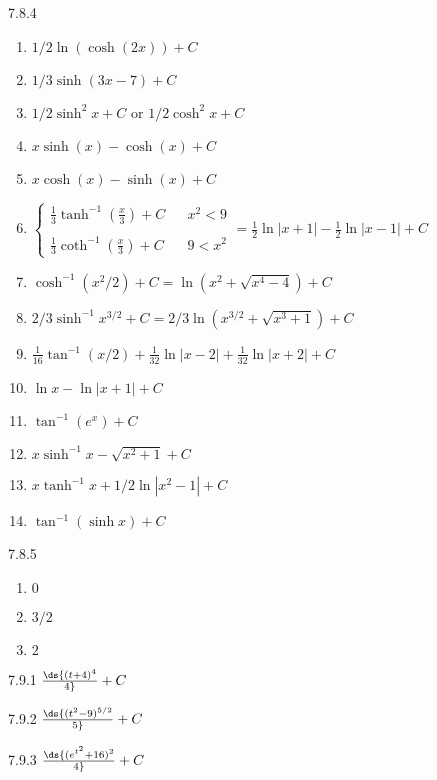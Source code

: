 \begin{Answer}{7.8.4}
	\begin{enumerate}
	\item {$1/2\ln (\cosh(2x))+C$}
	\item {$1/3\sinh(3x-7)+C$}
	\item {$1/2\sinh^2x+C$ or $1/2\cosh^2x+C$}
	\item {$x \sinh (x)-\cosh (x)+C$
	}
	\item {$x \cosh (x)-\sinh (x)+C$
	}
	\item {$\left\{\begin{array}{ccc} \frac13\tanh^{-1}\left(\frac x3\right)+C & & x^2<9 \\ \\
	\frac13\coth^{-1}\left(\frac x3\right)+C & & 9<x^2 \end{array}\right. = \frac12\ln |x+1| - \frac12\ln |x-1|+C$}
	\item  {$\cosh^{-1} (x^2/2) + C = \ln (x^2+\sqrt{x^4-4})+C$}
	\item {$2/3\sinh^{-1} x^{3/2} + C = 2/3\ln (x^{3/2}+\sqrt{x^3+1})+C$}
	\item {$\frac{1}{16}\tan^{-1}(x/2)+\frac{1}{32}\ln |x-2|+\frac1{32}\ln|x+2|+C$}
	\item {$\ln x- \ln|x+1|+C$}
	\item {$\tan^{-1}(e^x)+C$}
	\item {$x\sinh^{-1}x-\sqrt{x^2+1}+C$}
	\item {$x\tanh^{-1}x+1/2\ln|x^2-1|+C$}
	\item  {$\tan^{-1}(\sinh x)+C$}
	\end{enumerate}
	
\end{Answer}
\begin{Answer}{7.8.5}
	\begin{enumerate}
	\item {$0$}
	\item {$3/2$}

	\item {$2$}
	\end{enumerate}
	
\end{Answer}
\begin{Answer}{7.9.1}
 $\ds{(t+4)^4\over4}+C$
\end{Answer}
\begin{Answer}{7.9.2}
 $\ds{(t^2-9)^{5/2}\over5}+C$
\end{Answer}
\begin{Answer}{7.9.3}
 $\ds{(e^{t^2}+16)^2\over 4}+C$
\end{Answer}

